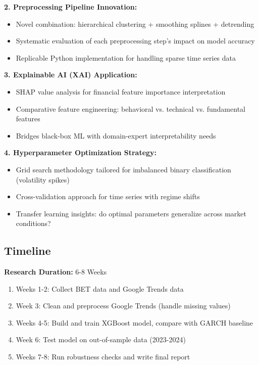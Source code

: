 \documentclass[12pt,a4paper]{article}
\begin{document}
\textbf{2. Preprocessing Pipeline Innovation:}
\begin{itemize}
    \item Novel combination: hierarchical clustering + smoothing splines + detrending
    \item Systematic evaluation of each preprocessing step's impact on model accuracy
    \item Replicable Python implementation for handling sparse time series data
\end{itemize}

\textbf{3. Explainable AI (XAI) Application:}
\begin{itemize}
    \item SHAP value analysis for financial feature importance interpretation
    \item Comparative feature engineering: behavioral vs. technical vs. fundamental features
    \item Bridges black-box ML with domain-expert interpretability needs
\end{itemize}

\textbf{4. Hyperparameter Optimization Strategy:}
\begin{itemize}
    \item Grid search methodology tailored for imbalanced binary classification (volatility spikes)
    \item Cross-validation approach for time series with regime shifts
    \item Transfer learning insights: do optimal parameters generalize across market conditions?
\end{itemize}

\subsection{Timeline}

\textbf{Research Duration:} 6-8 Weeks

\begin{enumerate}
    \item Weeks 1-2: Collect BET data and Google Trends data
    \item Week 3: Clean and preprocess Google Trends (handle missing values)
    \item Weeks 4-5: Build and train XGBoost model, compare with GARCH baseline
    \item Week 6: Test model on out-of-sample data (2023-2024)
    \item Weeks 7-8: Run robustness checks and write final report
\end{enumerate}
\end{document}
